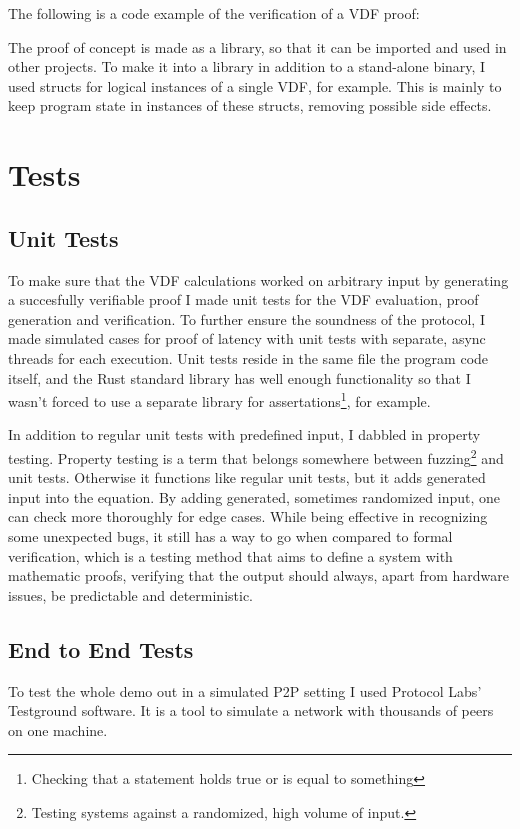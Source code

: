 The following is a code example of the verification of a VDF proof:

The proof of concept is made as a library, so that it can be imported and used in other projects. To make it into a library in addition to a stand-alone binary, I used structs for logical instances of a single VDF, for example. This is mainly to keep program state in instances of these structs, removing possible side effects.


\section{Tests}
\subsection{Unit Tests}
To make sure that the VDF calculations worked on arbitrary input by generating a succesfully verifiable proof I made unit tests for the VDF evaluation, proof generation and verification. To further ensure the soundness of the protocol, I made simulated cases for proof of latency with unit tests with separate, async threads for each execution. Unit tests reside in the same file the program code itself, and the Rust standard library has well enough functionality so that I wasn't forced to use a separate library for assertations\footnote{Checking that a statement holds true or is equal to something}, for example.

In addition to regular unit tests with predefined input, I dabbled in property testing. Property testing is a term that belongs somewhere between fuzzing\footnote{Testing systems against a randomized, high volume of input.} and unit tests. Otherwise it functions like regular unit tests, but it adds generated input into the equation. By adding generated, sometimes randomized input, one can check more thoroughly for edge cases. While being effective in recognizing some unexpected bugs, it still has a way to go when compared to formal verification, which is a testing method that aims to define a system with mathematic proofs, verifying that the output should always, apart from hardware issues, be predictable and deterministic.

\subsection{End to End Tests}
To test the whole demo out in a simulated P2P setting I used Protocol Labs' Testground software. It is a tool to simulate a network with thousands of peers on one machine.
